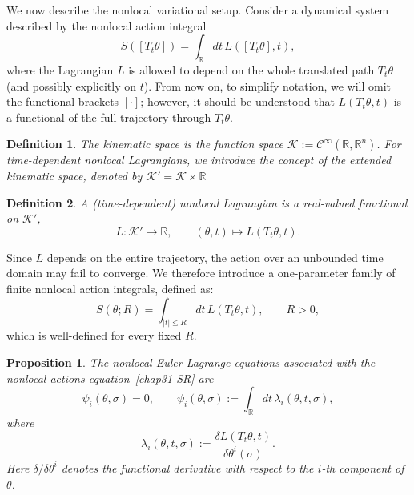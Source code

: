 \documentclass{article} %
\def\eqref#1{equation~\ref{#1}}
\newtheorem{proposition}{Proposition}
\newtheorem{definition}{Definition}
\begin{document}
We now describe the nonlocal variational setup. Consider a dynamical system described by the nonlocal action integral
\begin{equation}\label{chap31-IA}
S([T_t\theta])=\int_{\mathbb{R}} dt\,L([T_t\theta],t),
\end{equation}
where the Lagrangian $L$ is allowed to depend on the whole translated path $T_t\theta$ (and possibly explicitly on $t$). From now on, to simplify notation, we will omit the functional brackets $[\cdot]$; however, it should be understood that $L(T_t\theta,t)$ is a functional of the full trajectory through $T_t\theta$.

\begin{definition}
The kinematic space is the function space $\mathcal{K}:=\mathcal{C}^\infty(\mathbb{R},\mathbb{R}^n)$. For time-dependent nonlocal Lagrangians, we introduce the concept of the extended kinematic space, denoted by \( \mathcal{K}' = \mathcal{K} \times \mathbb{R} \)
\end{definition}

\begin{definition}
A (time-dependent) nonlocal Lagrangian is a real-valued functional on $\mathcal{K}'$,
\[
L:\mathcal{K}'\to\mathbb{R},\qquad (\theta,t)\mapsto L(T_t\theta,t).
\]
\end{definition}

Since $L$ depends on the entire trajectory, the action over an unbounded time domain may fail to converge. We therefore introduce a one-parameter family of finite nonlocal action integrals, defined as:
\begin{equation}\label{chap31-SR}
S(\theta;R)=\int_{|t|\le R}dt\,L(T_t\theta,t),\qquad R>0,
\end{equation}
which is well-defined for every fixed $R$. 

\begin{proposition}
The nonlocal Euler-Lagrange equations associated with the nonlocal actions \eqref{chap31-SR} are
\begin{equation}\label{chap31-EOMS}
\psi_i(\theta,\sigma)=0,
\qquad
\psi_i(\theta,\sigma):=\int_{\mathbb{R}}dt\,\lambda_i(\theta,t,\sigma),
\end{equation}
where
\begin{equation}\label{chap31-Lambda}
\lambda_i(\theta,t,\sigma):=\frac{\delta L(T_t\theta,t)}{\delta\theta^i(\sigma)}.
\end{equation}
Here $\delta/\delta\theta^i$ denotes the functional derivative with respect to the $i$-th component of $\theta$.
\end{proposition}
\end{document}
